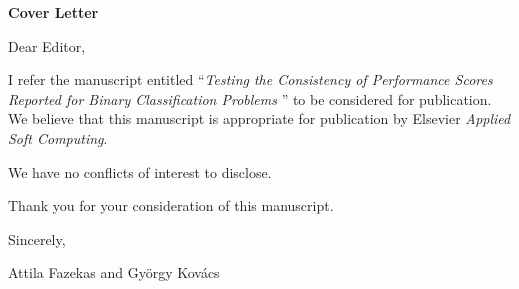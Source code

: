 \documentclass{article}
\begin{document}
\begin{center}
{
\Large\bf
Cover Letter
}
\end{center}
\bigskip

\bigskip 

Dear Editor,

\bigskip
I refer the manuscript entitled “{\it Testing the Consistency of Performance Scores Reported for Binary Classification Problems }” to be considered for publication. We believe that this manuscript is appropriate for publication by Elsevier {\it Applied Soft Computing}.  

We have no conflicts of interest to disclose. 

Thank you for your consideration of this manuscript. 

\bigskip
Sincerely,

\medskip
Attila Fazekas and Gy\"orgy Kov\'acs
\end{document}
